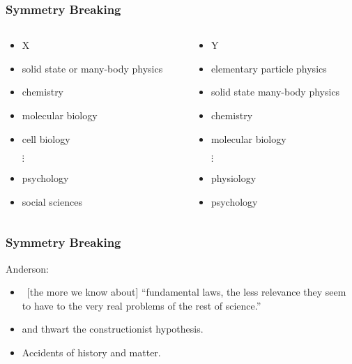 \begin{frame}
  \frametitle{Symmetry Breaking}

  \begin{block}{}
    \begin{columns}[t] 
      \begin{column}{0.45\textwidth} 
        \begin{itemize}
        \item X 
        \item solid state or many-body physics 
        \item chemistry \\ \mbox{}
        \item molecular biology 
        \item cell biology
        \item[$\vdots$]
        \item psychology
        \item social sciences
        \end{itemize}
      \end{column} 
      \begin{column}{0.45\textwidth} 
        \begin{itemize}
        \item Y
        \item elementary particle physics 
        \item solid state many-body physics
        \item chemistry 
        \item molecular biology 
        \item[$\vdots$]
        \item physiology 
        \item psychology
        \end{itemize}
      \end{column} 
    \end{columns} 
  \end{block}

\end{frame}

\begin{frame}
  \frametitle{Symmetry Breaking}

  \begin{block}{Anderson:}
    \begin{itemize}
    \item<+->
      \ [the more we know about] ``fundamental laws, the less
      relevance they seem to have to the very real problems
      of the rest of science.''
    \item<+->
       and 
      thwart the constructionist hypothesis.
    \item<+->
      Accidents of history 
      and 
      matter.
    \end{itemize}
  \end{block}

\end{frame}


